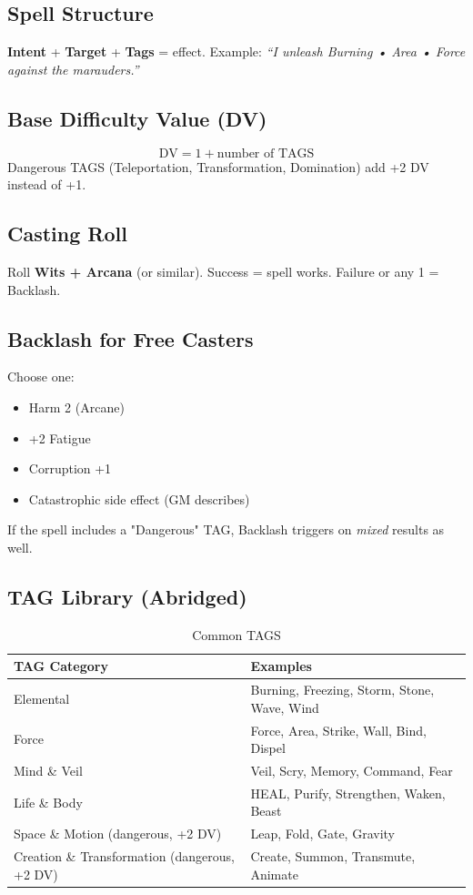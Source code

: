 \subsection{Spell Structure}
\textbf{Intent} + \textbf{Target} + \textbf{Tags} = effect. Example: \textit{``I unleash Burning • Area • Force against the marauders.''}

\subsection{Base Difficulty Value (DV)}
\[
\text{DV} = 1 + \text{number of TAGS}
\]
Dangerous TAGS (Teleportation, Transformation, Domination) add +2 DV instead of +1.

\subsection{Casting Roll}
Roll \textbf{Wits + Arcana} (or similar). Success = spell works. Failure or any 1 = Backlash.

\subsection{Backlash for Free Casters}
Choose one:
\begin{itemize}
    \item Harm 2 (Arcane)
    \item +2 Fatigue
    \item Corruption +1
    \item Catastrophic side effect (GM describes)
\end{itemize}
If the spell includes a "Dangerous" TAG, Backlash triggers on \emph{mixed} results as well.

\subsection{TAG Library (Abridged)}\label{subsec:tag_library}

\begin{longtable}{p{3.5cm} p{10cm}}
\caption{Common TAGS}\label{tab:tags_abridged}\\
\toprule
\textbf{TAG Category} & \textbf{Examples} \\
\midrule
Elemental & Burning, Freezing, Storm, Stone, Wave, Wind \\
Force & Force, Area, Strike, Wall, Bind, Dispel \\
Mind \& Veil & Veil, Scry, Memory, Command, Fear \\
Life \& Body & HEAL, Purify, Strengthen, Waken, Beast \\
Space \& Motion (dangerous, +2 DV) & Leap, Fold, Gate, Gravity \\
Creation \& Transformation (dangerous, +2 DV) & Create, Summon, Transmute, Animate \\
\bottomrule
\end{longtable}

